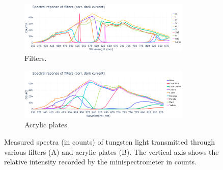 \begin{figure}[h!]
    \centering
    \begin{subfigure}{\textwidth}
        \centering
        \includegraphics[trim=0mm 0mm 0mm 25mm, clip, width=0.9\textwidth]{Figures/C3/filtros_spec.png}
        \caption{Filters.}
        \label{fig:filtros_espectros}
    \end{subfigure}
    \vspace{1em}
    \begin{subfigure}{\textwidth}
        \centering
        \includegraphics[trim=0mm 0mm 0mm 25mm, clip, width=0.9\textwidth]{Figures/C3/laminas_spec.png}
        \caption{Acrylic plates.}
        \label{fig:laminas_espectros}
    \end{subfigure}
    \caption{Measured spectra (in counts) of tungsten light transmitted through various filters (A) and acrylic plates (B). The vertical axis shows the relative intensity recorded by the minispectrometer in counts.}
    \label{fig:espectros_combinados}
\end{figure}

